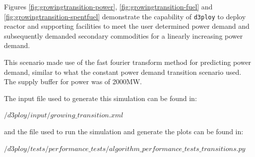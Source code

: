 \documentclass[11pt,letterpaper]{article}
\newcommand{\deploy}{\texttt{d3ploy}\xspace}%
\begin{document}
Figures \ref{fig:growingtransition-power}, \ref{fig:growingtransition-fuel}
and \ref{fig:growingtransition-spentfuel} demonstrate the capability 
of \deploy to deploy reactor and supporting facilities to meet the user 
determined power demand and subsequently demanded secondary commodities 
for a linearly increasing power demand. 

This scenario made use of the fast fourier transform method for predicting power
demand, similar to what the constant power demand transition scenario used.
The supply buffer for power was of 2000MW. 

The input file used to generate this simulation can be found in:

\noindent
$/d3ploy/input/growing\_transition.xml$

\noindent
and the file used to run the simulation and generate the plots can be found in:

\noindent
$/d3ploy/tests/performance\_tests/algorithm\_performance\_tests\_transitions.py$
\end{document}
